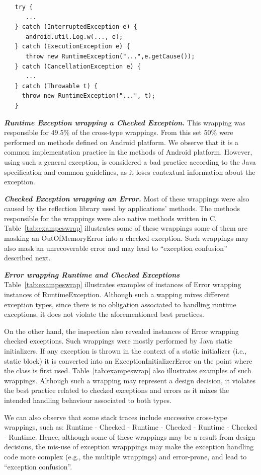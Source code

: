 \documentclass[conference]{IEEEtran}
\begin{document}
{\footnotesize
\begin{verbatim}
   try {
      ...
   } catch (InterruptedException e) {
      android.util.Log.w(..., e);
   } catch (ExecutionException e) {
      throw new RuntimeException("...",e.getCause());
   } catch (CancellationException e) {
      ...
   } catch (Throwable t) {
     throw new RuntimeException("...", t);
   }
\end{verbatim}
}

\emph{\textbf{Runtime Exception wrapping a Checked Exception.}} 
This wrapping was responsible for 49.5\% of
the cross-type wrappings.  From this set 50\%  were performed on methods defined on Android platform. 
We observe that it is a common implementation practice in the methods of Android platform.
However, using such a general exception, is considered a bad practice
according to the Java specification 
and common guidelines, as it loses contextual information about the exception.

\emph{\textbf{Checked Exception wrapping an Error.}} Most of these wrappings
 were also caused by the reflection library used by applications' methods. The methods responsible for the wrappings
were also native methods written in C. Table~\ref{tab:exampeswrap} illustrates
some of these wrappings some of them are masking an OutOfMemoryError
into a checked exception. Such wrappings may also mask an unrecoverable error
and may lead to ``exception confusion'' described next.

\emph{\textbf{Error wrapping Runtime and Checked Exceptions}} Table~\ref{tab:exampeswrap}  illustrates
examples of instances of Error wrapping instances of
RuntimeException. 
Although such a wapping mixes different exception types,
since there is no obligation associated to handling runtime exceptions, it
does not violate the aforementioned best practices. 

On the other hand, the inspection 
also revealed instances of Error wrapping checked exceptions. Such wrappings were 
mostly performed by Java static initializers. If any exception is thrown in the context of a static initializer 
(i.e., static block)  it is converted into an ExceptionInitializerError 
on the point where the class is first used.  Table~\ref{tab:exampeswrap} also illustrates
examples of such wrappings. Although such a wrapping may represent a design decision,
it violates the best practice related to checked exceptions and errors as it mixes the intended handling 
behaviour associated to both types.

We can also observe that some stack traces include successive cross-type wrappings, 
such as: Runtime - Checked - Runtime - Checked - Runtime - Checked -
Runtime. 
Hence, although some of these wrappings may be a result from design decisions, the mis-use of exception wrapppings may make the exception handling 
code more complex (e.g., the multiple wrappings) and error-prone,
 and lead to ``exception confusion''. 
\end{document}
